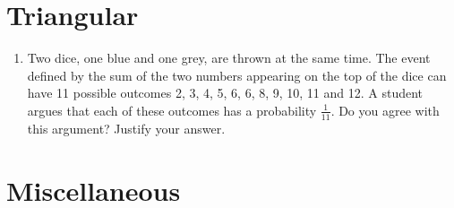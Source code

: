     \section{Triangular}
\begin{enumerate}[label=\thesection.\arabic*,ref=\thesection.\theenumi]
	\item Two dice, one blue and one grey, are thrown at the same time.   The event defined by the sum of the two numbers appearing on the top of the dice can have 11 possible outcomes 2, 3, 4, 5, 6, 6, 8, 9, 10, 11 and 12.  A student argues that each of these outcomes has a probability $\frac{1}{11}$.  Do you agree with this argument?  Justify your answer.
    \end{enumerate}
    \section{Miscellaneous}
